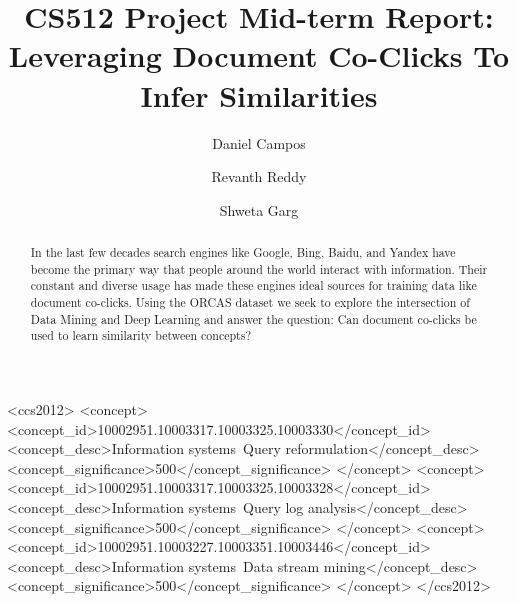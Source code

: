 \documentclass[sigplan,screen]{acmart}
\begin{document}
\title{CS512 Project Mid-term Report: Leveraging Document Co-Clicks To Infer Similarities}


\author{Daniel Campos} \author{Revanth Reddy}
\author{Shweta Garg} 


\begin{abstract}
In the last few decades search engines like Google, Bing, Baidu, and Yandex have become the primary way that people around the world interact with information. Their constant and diverse usage has made these engines ideal sources for training data like document co-clicks. Using the ORCAS dataset we seek to explore the intersection of Data Mining and Deep Learning and answer the question: Can document co-clicks be used to learn similarity between concepts?
\end{abstract}

\begin{CCSXML}
<ccs2012>
<concept>
<concept_id>10002951.10003317.10003325.10003330</concept_id>
<concept_desc>Information systems~Query reformulation</concept_desc>
<concept_significance>500</concept_significance>
</concept>
<concept>
<concept_id>10002951.10003317.10003325.10003328</concept_id>
<concept_desc>Information systems~Query log analysis</concept_desc>
<concept_significance>500</concept_significance>
</concept>
<concept>
<concept_id>10002951.10003227.10003351.10003446</concept_id>
<concept_desc>Information systems~Data stream mining</concept_desc>
<concept_significance>500</concept_significance>
</concept>
</ccs2012>
\end{CCSXML}



\maketitle





\end{document}
